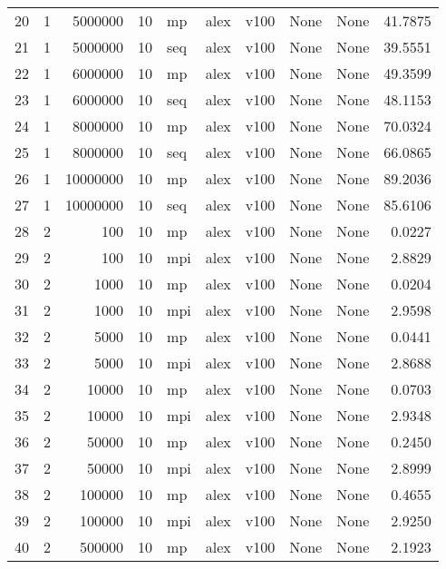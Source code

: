 \begin{tabular}{lrrrlllllr}
20  &   1 &   5000000 &      10 &   mp &  alex &  v100 &  None &  None &  41.7875 \\
21  &   1 &   5000000 &      10 &  seq &  alex &  v100 &  None &  None &  39.5551 \\
22  &   1 &   6000000 &      10 &   mp &  alex &  v100 &  None &  None &  49.3599 \\
23  &   1 &   6000000 &      10 &  seq &  alex &  v100 &  None &  None &  48.1153 \\
24  &   1 &   8000000 &      10 &   mp &  alex &  v100 &  None &  None &  70.0324 \\
25  &   1 &   8000000 &      10 &  seq &  alex &  v100 &  None &  None &  66.0865 \\
26  &   1 &  10000000 &      10 &   mp &  alex &  v100 &  None &  None &  89.2036 \\
27  &   1 &  10000000 &      10 &  seq &  alex &  v100 &  None &  None &  85.6106 \\
28  &   2 &       100 &      10 &   mp &  alex &  v100 &  None &  None &   0.0227 \\
29  &   2 &       100 &      10 &  mpi &  alex &  v100 &  None &  None &   2.8829 \\
30  &   2 &      1000 &      10 &   mp &  alex &  v100 &  None &  None &   0.0204 \\
31  &   2 &      1000 &      10 &  mpi &  alex &  v100 &  None &  None &   2.9598 \\
32  &   2 &      5000 &      10 &   mp &  alex &  v100 &  None &  None &   0.0441 \\
33  &   2 &      5000 &      10 &  mpi &  alex &  v100 &  None &  None &   2.8688 \\
34  &   2 &     10000 &      10 &   mp &  alex &  v100 &  None &  None &   0.0703 \\
35  &   2 &     10000 &      10 &  mpi &  alex &  v100 &  None &  None &   2.9348 \\
36  &   2 &     50000 &      10 &   mp &  alex &  v100 &  None &  None &   0.2450 \\
37  &   2 &     50000 &      10 &  mpi &  alex &  v100 &  None &  None &   2.8999 \\
38  &   2 &    100000 &      10 &   mp &  alex &  v100 &  None &  None &   0.4655 \\
39  &   2 &    100000 &      10 &  mpi &  alex &  v100 &  None &  None &   2.9250 \\
40  &   2 &    500000 &      10 &   mp &  alex &  v100 &  None &  None &   2.1923 \\

\end{tabular}
